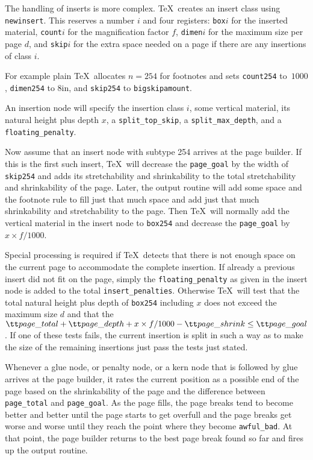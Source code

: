 The handling of inserts is more complex.
\TeX\ creates an insert class using {\tt newinsert}. This reserves a number $i$
and four registers: {\tt box\hair$i$} for the inserted material,
{\tt count\hair$i$} for the magnification factor $f$, {\tt dimen\hair$i$}
for the maximum size per page $d$, and {\tt skip\hair$i$} for the
extra space needed on a page if there are any insertions of class $i$.

For example plain \TeX\ allocates $n=254$ for footnotes and sets
{\tt count254} to~$1000$, {\tt dimen254} to 8in, and {\tt skip254} to 
{\tt \BS big\-skip\-amount}.

An insertion node will specify the insertion class $i$, some vertical material,
its natural height plus depth $x$, a {\tt split\-\_top\-\_skip}, a {\tt split\-\_max\_depth},
and a {\tt floa\-ting\-\_pe\-nal\-ty}. 


Now assume that an insert node with subtype 254 arrives at the page builder.
If this is the first such insert, \TeX\ will decrease the {\tt page\_goal}
by the width of {\tt skip254} and adds its stretchability and shrinkability
to the total stretchability and shrinkability of the page. Later,
the output routine will add some space and the footnote rule to fill just that
much space and add just that much shrinkability and stretchability to the page.
Then \TeX\ will normally add the vertical material in the insert node to
{\tt box254} and decrease the {\tt page\_goal} by $x\times f/1000$.

Special processing is required if \TeX\ detects that there is not enough space on
the current page to accommodate the complete insertion.
If already a previous insert did not fit on the page, simply the {\tt floating\_penalty}
as given in the insert node is added to the total {\tt insert\_penalties}.
Otherwise \TeX\ will test that the total natural height plus depth of {\tt box254} 
including $x$ does not exceed the maximum size $d$ and that the 
${\tt page\_total} + {\tt page\_depth} + x\times f/1000 - {\tt page\_shrink} \le {\tt page\_goal}$.
If one of these tests fails, the current insertion
is split in such a way as to make the size of the remaining insertions just pass the tests
just stated.

Whenever a glue node, or penalty node, or a kern node that is followed by glue arrives
at the page builder, it rates the current position as a possible end of the page based on
the shrinkability of the page and the difference between {\tt page\_total} and {\tt page\_goal}.
As the page fills, the page breaks tend to become better and better until the
page starts to get overfull and the page breaks get worse and worse until
they reach the point where they become {\tt awful\_bad}. At that point,
the page builder returns to the best page break found so far and fires up the 
output routine.


